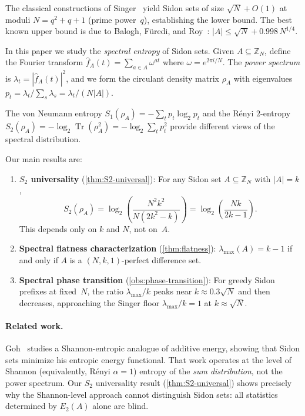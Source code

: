 \documentclass[11pt]{article}
\theoremstyle{definition}
\theoremstyle{remark}
\newcommand{\Z}{\mathbb{Z}}
\newcommand{\fhat}{\widehat{f}}
\newcommand{\lmax}{\lambda_{\max}}
\newcommand{\Tr}{\operatorname{Tr}}
\begin{document}
The classical constructions of Singer~\cite{Singer1938} yield Sidon
sets of size $\sqrt{N} + O(1)$ at moduli $N = q^2 + q + 1$ (prime
power~$q$), establishing the lower bound.
The best known upper bound is due to Balogh, F\"uredi, and
Roy~\cite{BFR2023}: $|A| \le \sqrt{N} + 0.998\,N^{1/4}$.

\medskip

In this paper we study the \emph{spectral entropy} of Sidon sets.
Given $A \subseteq \Z_N$, define the Fourier transform
$\fhat_A(t) = \sum_{a \in A} \omega^{at}$ where
$\omega = e^{2\pi i/N}$.  The \emph{power spectrum} is
$\lambda_t = |\fhat_A(t)|^2$, and we form the circulant density
matrix $\rho_A$ with eigenvalues
$p_t = \lambda_t / \sum_s \lambda_s = \lambda_t / (N|A|)$.

The von Neumann entropy $S_1(\rho_A) = -\sum_t p_t \log_2 p_t$ and
the R\'enyi $2$-entropy
$S_2(\rho_A) = -\log_2 \Tr(\rho_A^2) = -\log_2 \sum_t p_t^2$
provide different views of the spectral distribution.

Our main results are:

\begin{enumerate}[label=(\roman*)]
\item \textbf{$S_2$ universality} (\cref{thm:S2-universal}):
For any Sidon set $A \subseteq \Z_N$ with $|A| = k$,
\[
  S_2(\rho_A) = \log_2\!\left(\frac{N^2 k^2}{N(2k^2 - k)}\right)
  = \log_2\!\left(\frac{Nk}{2k - 1}\right).
\]
This depends only on $k$ and $N$, not on~$A$.

\item \textbf{Spectral flatness characterization}
(\cref{thm:flatness}):
$\lmax(A) = k - 1$ if and only if $A$ is a
$(N, k, 1)$-perfect difference set.

\item \textbf{Spectral phase transition}
(\cref{obs:phase-transition}):
For greedy Sidon prefixes at fixed~$N$, the ratio $\lmax/k$ peaks
near $k \approx 0.3\sqrt{N}$ and then decreases, approaching the
Singer floor $\lmax/k = 1$ at $k \approx \sqrt{N}$.
\end{enumerate}

\paragraph{Related work.}
Goh~\cite{Goh2024} studies a Shannon-entropic analogue of additive
energy, showing that Sidon sets minimize his entropic energy functional.
That work operates at the level of Shannon (equivalently, R\'enyi
$\alpha = 1$) entropy of the \emph{sum distribution}, not the power
spectrum.  Our $S_2$ universality result (\cref{thm:S2-universal})
shows precisely why the Shannon-level approach cannot distinguish
Sidon sets: all statistics determined by $E_2(A)$ alone are blind.
\end{document}
